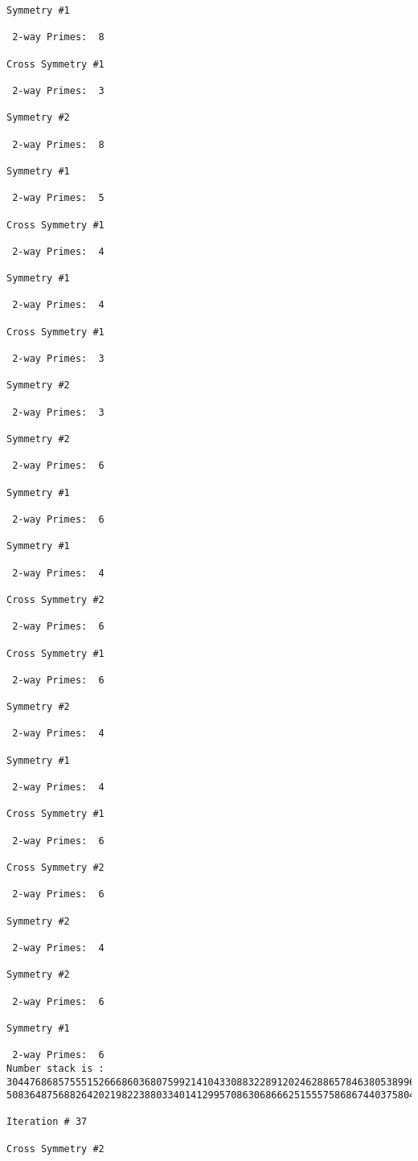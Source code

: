 \begin{verbatim}
Symmetry #1

 2-way Primes: 	8

Cross Symmetry #1

 2-way Primes: 	3

Symmetry #2

 2-way Primes: 	8

Symmetry #1

 2-way Primes: 	5

Cross Symmetry #1

 2-way Primes: 	4

Symmetry #1

 2-way Primes: 	4

Cross Symmetry #1

 2-way Primes: 	3

Symmetry #2

 2-way Primes: 	3

Symmetry #2

 2-way Primes: 	6

Symmetry #1

 2-way Primes: 	6

Symmetry #1

 2-way Primes: 	4

Cross Symmetry #2

 2-way Primes: 	6

Cross Symmetry #1

 2-way Primes: 	6

Symmetry #2

 2-way Primes: 	4

Symmetry #1

 2-way Primes: 	4

Cross Symmetry #1

 2-way Primes: 	6

Cross Symmetry #2

 2-way Primes: 	6

Symmetry #2

 2-way Primes: 	4

Symmetry #2

 2-way Primes: 	6

Symmetry #1

 2-way Primes: 	6
Number stack is :
30447686857555152666860368075992141043308832289120246288657846380538996794608835958544046240163340857
50836487568826420219822388033401412995708630686662515557586867440375804336104264044585953880649769983

Iteration #	37

Cross Symmetry #2


\end{verbatim}
